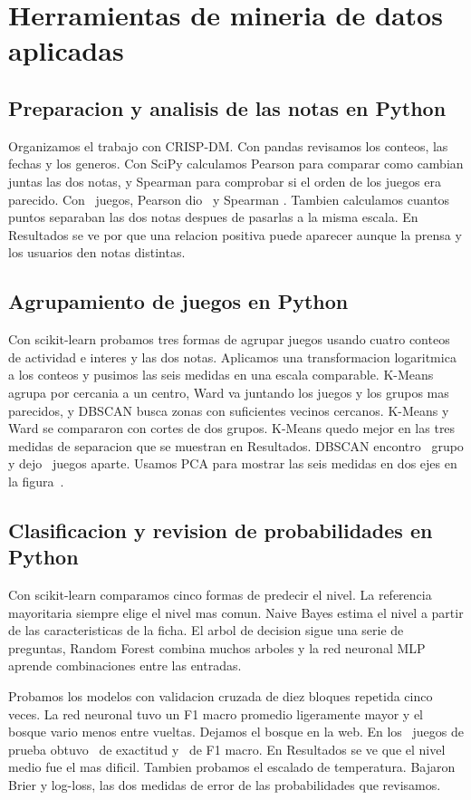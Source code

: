 \documentclass[letterpaper,11pt]{article}
\begin{document}
\section{Herramientas de mineria de datos aplicadas}
\subsection{Preparacion y analisis de las notas en Python}
Organizamos el trabajo con CRISP-DM. Con pandas revisamos los conteos, las fechas y los generos. Con SciPy calculamos Pearson para comparar como cambian juntas las dos notas, y Spearman para comprobar si el orden de los juegos era parecido. Con \Pares\ juegos, Pearson dio \PearsonGlobal\ y Spearman \SpearmanGlobal. Tambien calculamos cuantos puntos separaban las dos notas despues de pasarlas a la misma escala. En Resultados se ve por que una relacion positiva puede aparecer aunque la prensa y los usuarios den notas distintas.

\subsection{Agrupamiento de juegos en Python}
Con scikit-learn probamos tres formas de agrupar juegos usando cuatro conteos de actividad e interes y las dos notas. Aplicamos una transformacion logaritmica a los conteos y pusimos las seis medidas en una escala comparable. K-Means agrupa por cercania a un centro, Ward va juntando los juegos y los grupos mas parecidos, y DBSCAN busca zonas con suficientes vecinos cercanos. K-Means y Ward se compararon con cortes de dos grupos. K-Means quedo mejor en las tres medidas de separacion que se muestran en Resultados. DBSCAN encontro \GruposDbscan\ grupo y dejo \RuidoDbscan\ juegos aparte. Usamos PCA para mostrar las seis medidas en dos ejes en la figura~.

\subsection{Clasificacion y revision de probabilidades en Python}
Con scikit-learn comparamos cinco formas de predecir el nivel. La referencia mayoritaria siempre elige el nivel mas comun. Naive Bayes estima el nivel a partir de las caracteristicas de la ficha. El arbol de decision sigue una serie de preguntas, Random Forest combina muchos arboles y la red neuronal MLP aprende combinaciones entre las entradas.

Probamos los modelos con validacion cruzada de diez bloques repetida cinco veces. La red neuronal tuvo un F1 macro promedio ligeramente mayor y el bosque vario menos entre vueltas. Dejamos el bosque en la web. En los \JuegosPrueba\ juegos de prueba obtuvo \ExactitudPrueba\ de exactitud y \FPrueba\ de F1 macro. En Resultados se ve que el nivel medio fue el mas dificil. Tambien probamos el escalado de temperatura. Bajaron Brier y log-loss, las dos medidas de error de las probabilidades que revisamos.
\end{document}
